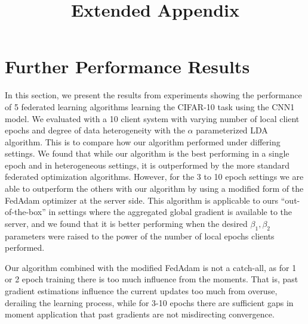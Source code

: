 \documentclass[conference,compsoc]{IEEEtran}
\title{Extended Appendix}
\begin{document}
\section{Further Performance Results}

In this section, we present the results from experiments showing the performance of 5 federated learning algorithms learning the CIFAR-10 task using the CNN1 model. We evaluated with a 10 client system with varying number of local client epochs and degree of data heterogeneity with the $\alpha$ parameterized LDA algorithm. This is to compare how our algorithm performed under differing settings. We found that while our algorithm is the best performing in a single epoch and in heterogeneous settings, it is outperformed by the more standard federated optimization algorithms. However, for the 3 to 10 epoch settings we are able to outperform the others with our algorithm by using a modified form of the FedAdam optimizer at the server side. This algorithm is applicable to ours ``out-of-the-box'' in settings where the aggregated global gradient is available to the server, and we found that it is better performing when the desired $\beta_1, \beta_2$ parameters were raised to the power of the number of local epochs clients performed.

\noindent Our algorithm combined with the modified FedAdam is not a catch-all, as for 1 or 2 epoch training there is too much influence from the moments. That is, past gradient estimations influence the current updates too much from overuse, derailing the learning process, while for 3-10 epochs there are sufficient gaps in moment application that past gradients are not misdirecting convergence.
\end{document}
